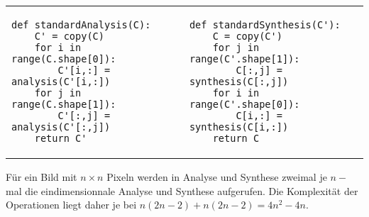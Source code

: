 \begin{adjustbox}{max width=\textwidth ,center}
\begin{tabular}{p{}|p{}}
\begin{verbatim}
def standardAnalysis(C):
    C' = copy(C)
    for i in range(C.shape[0]):
        C'[i,:] = analysis(C'[i,:])
    for j in range(C.shape[1]):
        C'[:,j] = analysis(C'[:,j])
    return C'
\end{verbatim}
&
\begin{verbatim}
def standardSynthesis(C'):
    C = copy(C')
    for j in range(C'.shape[1]):
        C[:,j] = synthesis(C[:,j])
    for i in range(C'.shape[0]):
        C[i,:] = synthesis(C[i,:])
    return C
\end{verbatim}
\\
\end{tabular}
\end{adjustbox}

\noindent Für ein Bild mit $n \times n$ Pixeln werden in Analyse und Synthese zweimal je $n-$mal die eindimensionnale Analyse und Synthese aufgerufen. Die Komplexität der Operationen liegt daher je bei $n(2n-2) + n(2n-2) = 4n^2-4n$.

